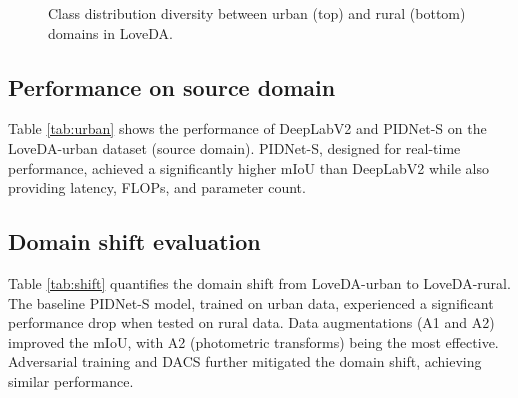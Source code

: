 \documentclass{article}
\begin{document}
\begin{multicols}{2}
\begin{figure}[H]
\begin{minipage}{1\linewidth}
			\end{minipage}
			\caption{Class distribution diversity between urban (top) and rural (bottom) domains in LoveDA.}  
			\label{fig:class_div}  

		\end{figure}


		\subsection{Performance on source domain}
		Table \ref{tab:urban} shows the performance of DeepLabV2 and PIDNet-S on the LoveDA-urban dataset (source domain). PIDNet-S, designed for real-time performance, achieved a significantly higher mIoU than DeepLabV2 while also providing latency, FLOPs, and parameter count.


		\begin{table}[H]
			\centering
			\renewcommand{\arraystretch}{1.2} %
			\setlength{\tabcolsep}{6pt} %
			
			\caption{Performance comparison of different hyperparameter tuning.}
			\label{tab:urban}
		\end{table}




		\subsection{Domain shift evaluation}
		\small
		Table \ref{tab:shift} quantifies the domain shift from LoveDA-urban to LoveDA-rural. The baseline PIDNet-S model, trained on urban data, experienced a significant performance drop when tested on rural data. Data augmentations (A1 and A2) improved the mIoU, with A2 (photometric transforms) being the most effective. Adversarial training and DACS further mitigated the domain shift, achieving similar performance.
		

\end{multicols}
\end{document}
